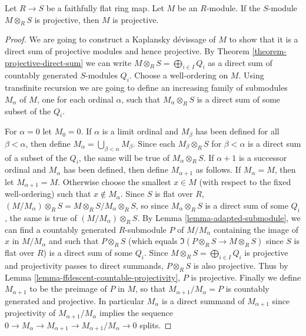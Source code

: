 %
\begin{theorem}
\label{theorem-ffdescent-projectivity}
Let $R \to S$ be a faithfully flat ring map.  Let $M$ be an $R$-module.
 If the $S$-module $M \otimes_R S$ is projective, then $M$ is projective.
\end{theorem}

\begin{proof}
We are going to construct a Kaplansky d\'evissage of $M$ to show that it is a
direct sum of projective modules and hence projective.  By Theorem
\ref{theorem-projective-direct-sum} we can write $M \otimes_R S =
\bigoplus_{i \in I} Q_i$ as a direct sum of countably generated $S$-modules
$Q_i$.  Choose a well-ordering on $M$.  Using transfinite recursion we are going
to define an increasing family of submodules $M_{\alpha}$ of $M$, one for each
ordinal $\alpha$, such that $M_{\alpha} \otimes_R S$ is a direct sum of some
subset of the $Q_i$.

\medskip\noindent
For $\alpha = 0$ let $M_0 = 0$.  If $\alpha$ is a limit ordinal and $M_{\beta}$
has been defined for all $\beta < \alpha$, then define $M_\alpha =
\bigcup_{\beta < \alpha} M_{\beta}$.  Since each $M_{\beta} \otimes_R S$ for
$\beta < \alpha$ is a direct sum of a subset of the $Q_i$, the same will be
true of $M_{\alpha} \otimes_R S$.  If $\alpha + 1$ is a successor ordinal and
$M_{\alpha}$ has been defined, then define $M_{\alpha + 1}$ as follows.  If
$M_{\alpha} = M$, then let $M_{\alpha +1} = M$.  Otherwise choose the smallest
$x \in M$ (with respect to the fixed well-ordering) such that $x \notin
M_{\alpha}$. Since $S$ is flat over $R$, $(M/M_{\alpha}) \otimes_R S = M
\otimes_R S/M_{\alpha} \otimes_R S$, so since $M_{\alpha} \otimes_R S$ is
a direct sum of some $Q_i$, the same is true of $(M/M_{\alpha}) \otimes_R
S$.   By Lemma \ref{lemma-adapted-submodule}, we can find a countably generated
$R$-submodule $P$ of $M/M_{\alpha}$ containing the image of $x$ in
$M/M_{\alpha}$ and such that $P \otimes_R S$ (which equals $\Im(P
\otimes_R S \to M \otimes_R S)$ since $S$ is flat over $R$) is a
direct sum of some $Q_i$. Since $M \otimes_R S = \bigoplus_{i \in I} Q_i$
is projective and projectivity passes to direct summands, $P \otimes_R S$ is
also projective.  Thus by Lemma \ref{lemma-ffdescent-countable-projectivity},
$P$ is projective.  Finally we define $M_{\alpha + 1}$ to be the preimage of $P$
in $M$, so that $M_{\alpha + 1}/M_{\alpha} = P$ is countably generated and
projective.  In particular $M_{\alpha}$ is a direct summand of $M_{\alpha + 1}$
since projectivity of $M_{\alpha + 1}/M_{\alpha}$ implies the sequence $0
\to M_{\alpha} \to M_{\alpha + 1} \to
M_{\alpha + 1}/M_{\alpha} \to 0$ splits.


\end{proof}
